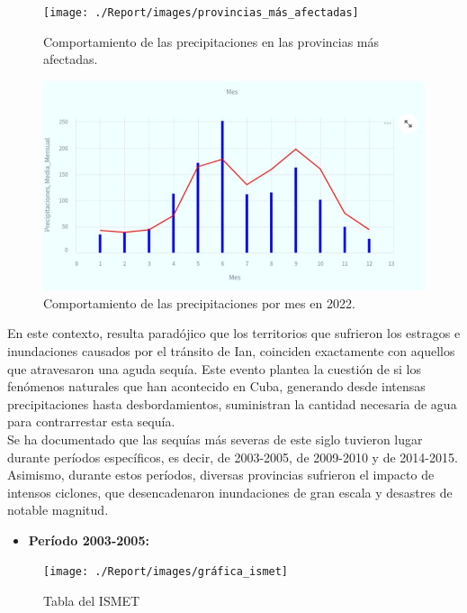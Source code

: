 \documentclass[12pt]{article}
\begin{document}
	\begin{figure}[H]
		\centering
		\texttt{[image: ./Report/images/provincias\_más\_afectadas]}
		\caption{Comportamiento de las precipitaciones en las provincias más afectadas.}
		\label{fig:provinciasmasafectadas}
	\end{figure}
	
	
	
	\begin{figure}[H]
		\centering
		\includegraphics[width=0.8\linewidth]{./Report/images/precipitaciones_2022}
		\caption{Comportamiento de las precipitaciones por mes en 2022.}
		\label{fig:precipitaciones2022}
	\end{figure}
	
	
	\newpage
	En este contexto, resulta paradójico que los territorios que sufrieron los estragos e inundaciones causados por el tránsito de Ian, coinciden exactamente con aquellos que atravesaron una aguda sequía. Este evento plantea la cuestión de si los fenómenos naturales que han acontecido en Cuba, generando desde intensas precipitaciones hasta desbordamientos, suministran la cantidad necesaria de agua para contrarrestar esta sequía.\\
	
	Se ha documentado que las sequías más severas de este siglo tuvieron lugar durante períodos específicos, es decir, de 2003-2005, de 2009-2010 y de 2014-2015. Asimismo, durante estos períodos, diversas provincias sufrieron el impacto de intensos ciclones, que desencadenaron inundaciones de gran escala y desastres de notable magnitud.\cite{webpage3}
 
	
	\begin{itemize}
		\item\textbf{Período 2003-2005:}
	\end{itemize}
	
	\begin{figure}[H]
		\centering
		\texttt{[image: ./Report/images/gráfica\_ismet]}
		\caption{Tabla del ISMET}
		\label{fig:graficaismet}
	\end{figure}
	
\end{document}
